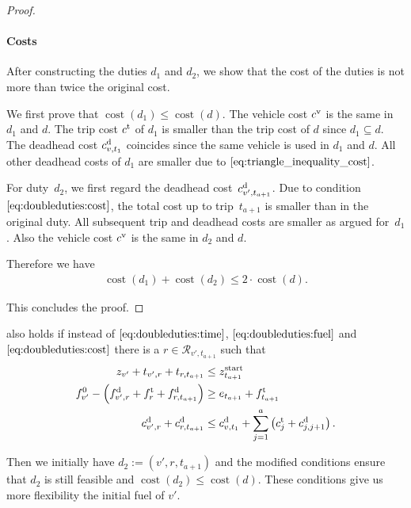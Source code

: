 \begin{proof}
\paragraph{Costs} \proofparfill

After constructing the duties $d_1$ and $d_2$, we show that the cost of the duties is not more than twice the original cost.

We first prove that ${\operatorname{cost}\left(d_1\right)\leq\operatorname{cost}\left(d\right)}$. The vehicle cost $c^{\operatorname{v}}$ is the same in $d_1$ and $d$. The trip cost $c^{\operatorname{t}}$ of $d_1$ is smaller than the trip cost of $d$ since ${d_1\subseteq d}$. The deadhead cost $c^{\operatorname{d}}_{v,t_1}$ coincides since the same vehicle is used in $d_1$ and $d$. All other deadhead costs of $d_1$ are smaller due to $\eqref{eq:triangle_inequality_cost}$.

For duty~$d_2$, we first regard the deadhead cost~$c^{\operatorname{d}}_{v',t_{a+1}}$. Due to condition~$\eqref{eq:doubleduties:cost}$, the total cost up to trip~$t_{a+1}$ is smaller than in the original duty. All subsequent trip and deadhead costs are smaller as argued for~$d_1$. Also the vehicle cost $c^{\operatorname{v}}$ is the same in $d_2$ and $d$.

Therefore we have
\begin{align*}
	\operatorname{cost}\left(d_1\right)+\operatorname{cost}\left(d_2\right)\leq 2\cdot\operatorname{cost}\left(d\right).
\end{align*}

This concludes the proof.
%
\end{proof}

\begin{remark}
\label{rem:doubleduties}

 also holds if instead of $\eqref{eq:doubleduties:time}$, $\eqref{eq:doubleduties:fuel}$ and $\eqref{eq:doubleduties:cost}$ there is a ${r\in\mathcal{R}_{v',t_{a+1}}}$ such that
\begin{align}
	z_{v'} + t_{v',r} + t_{r,t_{a+1}} & \leq z^{\operatorname{start}}_{t_{a+1}} \label{eq:doubleduties:time_r} \\
	f^0_{v'} - \left(f^{\operatorname{d}}_{v',r}+f^{\operatorname{t}}_r+f^{\operatorname{d}}_{r,t_{a+1}}\right) & \geq e_{t_{a+1}} + f^{\operatorname{t}}_{t_{a+1}} \label{eq:doubleduties:fuel_r} \\
	c^{\operatorname{d}}_{v',r}+c^{\operatorname{d}}_{r,t_{a+1}} & \leq c^{\operatorname{d}}_{v,t_1} + \sum_{j=1}^a \left(c^{\operatorname{t}}_j + c^{\operatorname{d}}_{j,j+1}\right). \label{eq:doubleduties:cost_r}
\end{align}

Then we initially have $d_2:=\left(v',r,t_{a+1}\right)$ and the modified conditions ensure that $d_2$ is still feasible and ${\operatorname{cost}\left(d_2\right)\leq\operatorname{cost}\left(d\right)}$. These conditions give us more flexibility \wrt the initial fuel of $v'$.

\end{remark}

